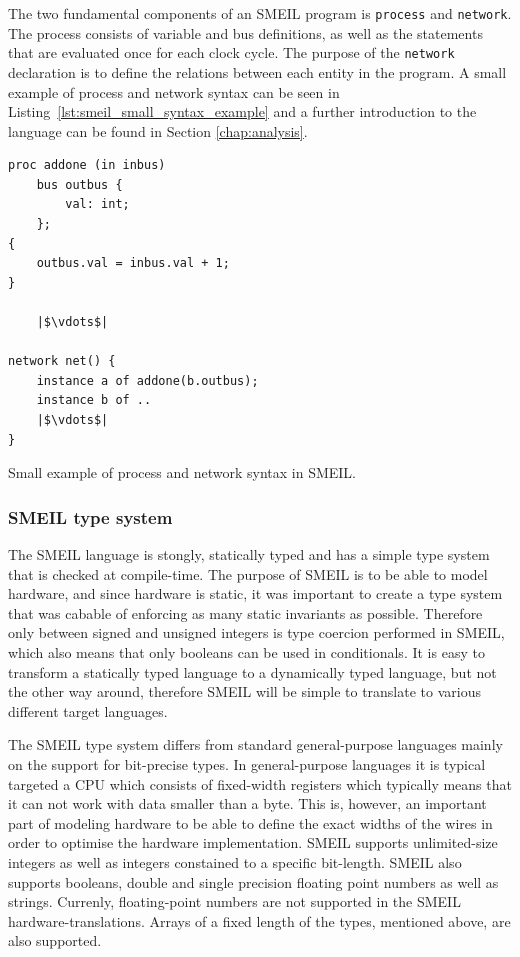 The two fundamental components of an SMEIL program is \texttt{process} and \texttt{network}. The process consists of variable and bus definitions, as well as the statements that are evaluated once for each clock cycle. The purpose of the \texttt{network} declaration is to define the relations between each entity in the program. A small example of process and network syntax can be seen in Listing~\ref{lst:smeil_small_syntax_example} and a further introduction to the language can be found in Section \ref{chap:analysis}.\\
\begin{listing}
\begin{verbatim}
proc addone (in inbus)
    bus outbus {
        val: int;
    };
{
    outbus.val = inbus.val + 1;
}

    |$\vdots$|

network net() {
    instance a of addone(b.outbus);
    instance b of ..
    |$\vdots$|
}
\end{verbatim}
\caption{Small example of process and network syntax in SMEIL.}
\label{lst:smeil_small_syntax_example}
\end{listing}

\subsubsection{SMEIL type system}
The SMEIL language is stongly, statically typed and has a simple type system that is checked at compile-time. The purpose of SMEIL is to be able to model hardware, and since hardware is static, it was important to create a type system that was cabable of enforcing as many static invariants as possible. Therefore only between signed and unsigned integers is type coercion performed in SMEIL, which also means that only booleans can be used in conditionals.
It is easy to transform a statically typed language to a dynamically typed language, but not the other way around, therefore SMEIL will be simple to translate to various different target languages.

The SMEIL type system differs from standard general-purpose languages mainly on the support for bit-precise types. In general-purpose languages it is typical targeted a CPU which consists of fixed-width registers which typically means that it can not work with data smaller than a byte. This is, however, an important part of modeling hardware to be able to define the exact widths of the wires in order to optimise the hardware implementation. SMEIL supports unlimited-size integers as well as integers constained to a specific bit-length. SMEIL also supports booleans, double and single precision floating point numbers as well as strings. Currenly, floating-point numbers are not supported in the SMEIL hardware-translations. %
Arrays of a fixed length of the types, mentioned above, are also supported.

